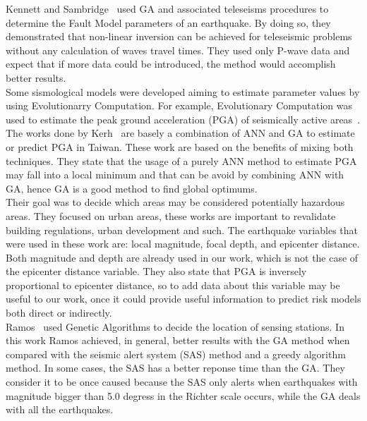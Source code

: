 Kennett and Sambridge~\cite{Kennett1992} used GA and associated teleseisms procedures to determine the Fault Model parameters of an earthquake. By doing so, they demonstrated that non-linear inversion can be achieved for teleseismic problems without any calculation of waves travel times. They used only P-wave data and expect that if more data could be introduced, the method would accomplish better results.\\

Some sismological models were developed aiming to estimate parameter values by using Evolutionarry Computation. For example, Evolutionary Computation was used to estimate the peak ground acceleration (PGA) of seismically active areas~\cite{Kermani2009,Cabalar2009,Kerh2010,Kerh2015}. \\

The works done by Kerh~\cite{Kerh2010, Kerh2015} are basely a combination of ANN and GA to estimate or predict PGA in Taiwan. These work are based on the benefits of mixing both techniques. They state that the usage of a purely ANN method to estimate PGA may fall into a local minimum and that can be avoid by combining ANN with GA, hence GA is a good method to find global optimums.\\

Their goal was to decide which areas may be considered potentially hazardous areas. They focused on urban areas, these works are important to revalidate building regulations, urban development and such. The earthquake variables that were used in these work are: local magnitude, focal depth, and epicenter distance. Both magnitude and depth are already used in our work, which is not the case of the epicenter distance variable. They also state that PGA is inversely proportional to epicenter distance, so to add data about this variable may be useful to our work, once it could provide useful information to predict risk models both direct or indirectly.\\
 
Ramos~\cite{Ramos2011} used Genetic Algorithms to decide the location of sensing stations. In this work Ramos achieved, in general, better results with the GA method when compared with the seismic alert system (SAS) method and a greedy algorithm method. In some cases, the SAS has a better reponse time than the GA. They consider it to be once caused because the SAS only alerts when earthquakes with magnitude bigger than 5.0 degress in the Richter scale occurs, while the GA deals with all the earthquakes.\\

